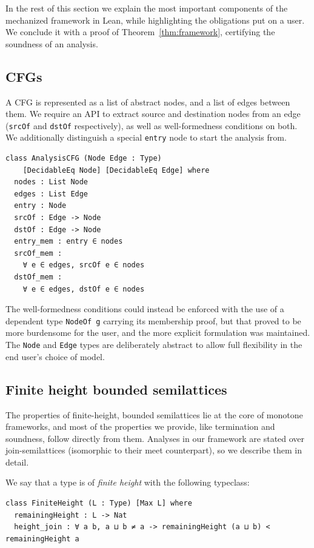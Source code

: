 \documentclass[runningheads]{llncs}
\newcommand{\lean}[1]{\lstinline[language=Lean]|#1|}
\begin{document}
In the rest of this section we explain the most important components of the mechanized framework in Lean, while highlighting the obligations put on a user. We conclude it with a proof of Theorem~\ref{thm:framework}, certifying the soundness of an analysis.

\subsection{CFGs}

A CFG is represented as a list of abstract nodes, and a list of edges between them. We require an API to extract source and destination nodes from an edge (\lean{srcOf} and \lean{dstOf} respectively), as well as well-formedness conditions on both. We additionally distinguish a special \lean{entry} node to start the analysis from.

\begin{lstlisting}[language=Lean]
class AnalysisCFG (Node Edge : Type)
    [DecidableEq Node] [DecidableEq Edge] where
  nodes : List Node
  edges : List Edge
  entry : Node
  srcOf : Edge -> Node
  dstOf : Edge -> Node
  entry_mem : entry ∈ nodes
  srcOf_mem :
    ∀ e ∈ edges, srcOf e ∈ nodes
  dstOf_mem :
    ∀ e ∈ edges, dstOf e ∈ nodes
\end{lstlisting}

The well-formedness conditions could instead be enforced with the use of a dependent type \lean{NodeOf g} carrying its membership proof, but that proved to be more burdensome for the user, and the more explicit formulation was maintained. The \lean{Node} and \lean{Edge} types are deliberately abstract to allow full flexibility in the end user's choice of model.

\subsection{Finite height bounded semilattices}

The properties of finite-height, bounded semilattices lie at the core of monotone frameworks, and most of the properties we provide, like termination and soundness, follow directly from them. Analyses in our framework are stated over join-semilattices (isomorphic to their meet counterpart), so we describe them in detail.

We say that a type is of \emph{finite height} with the following typeclass:

\begin{lstlisting}[language=Lean]
class FiniteHeight (L : Type) [Max L] where
  remainingHeight : L -> Nat
  height_join : ∀ a b, a ⊔ b ≠ a -> remainingHeight (a ⊔ b) < remainingHeight a
\end{lstlisting}
\end{document}
